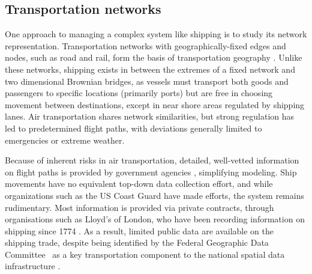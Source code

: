 



\subsection{Transportation networks}
One approach to managing a complex system like shipping is to study its network representation.  Transportation networks with geographically-fixed edges and nodes, such as road and rail, form the basis of transportation geography \citep{Rodrigue2009}. Unlike these networks, shipping exists in between the extremes of a fixed network %
 and two dimensional Brownian bridges, as vessels must transport both goods and passengers to specific locations (primarily ports) but are free in choosing movement between destinations, except in near shore areas regulated by shipping lanes. Air transportation shares network similarities, but strong regulation has led to predetermined flight paths, with deviations generally limited to emergencies or extreme weather. %

Because of inherent risks in air transportation, detailed, well-vetted information on flight paths is provided by government agencies \citep{guimera2005worldwide}, simplifying modeling. Ship movements have no equivalent top-down data collection effort, and while organizations such as the US Coast Guard have made efforts, the system remains rudimentary. Most information is provided via private contracts, through organisations such as Lloyd's of London, who have been recording information on shipping since 1774 \citep{Lloyd'sRegister-FairplayLtd.2010}. As a result, limited public data are available on the shipping trade, despite being identified by the Federal Geographic Data Committee~\citep{FGDC} as a key transportation component to the national spatial data infrastructure \citep{CurrierInPress}.

